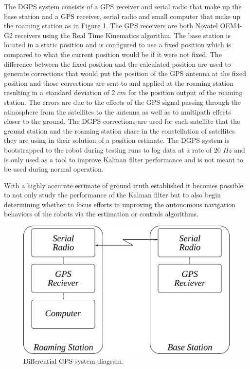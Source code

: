 The DGPS system consists of a GPS receiver and serial radio that make up the base station and a GPS receiver, serial radio and small computer that make up the roaming station as in Figure \ref{fig:dgps}. The GPS receivers are both Novatel OEM4-G2 receivers using the Real Time Kinematics algorithm. The base station is located in a static position and is configured to use a fixed position which is compared to what the current position would be if it were not fixed. The difference between the fixed position and the calculated position are used to generate corrections that would put the position of the GPS antenna at the fixed position and those corrections are sent to and applied at the roaming station resulting in a standard deviation of $2$ $cm$ for the position output of the roaming station. The errors are due to the effects of the GPS signal passing through the atmosphere from the satellites to the antenna as well as to multipath effects closer to the ground. The DGPS corrections are used for each satellite that the ground station and the roaming station share in the constellation of satellites they are using in their solution of a position estimate. The DGPS system is bootstrapped to the robot during testing runs to log data at a rate of $20$ $Hz$ and is only used as a tool to improve Kalman filter performance and is not meant to be used during normal operation.

With a highly accurate estimate of ground truth established it becomes possible to not only study the performance of the Kalman filter but to also begin determining whether to focus efforts in improving the autonomous navigation behaviors of the robots via the estimation or controls algorithms.

\begin{figure}[ht!]
	\centering
	\includegraphics[width=.6\textwidth]{images/dgps}
	\caption{Differential GPS system diagram.}
	\label{fig:dgps}
\end{figure}

